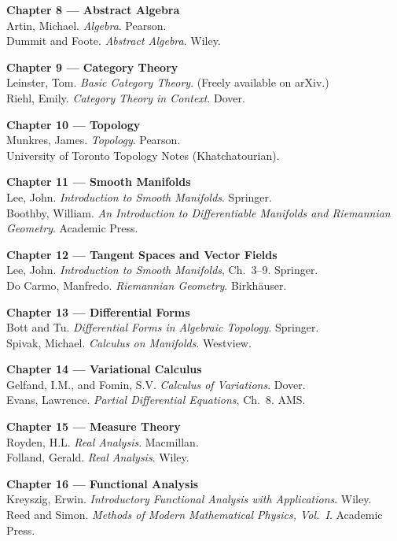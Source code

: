 \documentclass[12pt, twoside, openright, a4paper]{book}
\begin{document}
\medskip\noindent\textbf{Chapter 8 --- Abstract Algebra}\\
Artin, Michael. \textit{Algebra}. Pearson.\\
Dummit and Foote. \textit{Abstract Algebra}. Wiley.

\medskip\noindent\textbf{Chapter 9 --- Category Theory}\\
Leinster, Tom. \textit{Basic Category Theory}. (Freely available on arXiv.)\\
Riehl, Emily. \textit{Category Theory in Context}. Dover.

\medskip\noindent\textbf{Chapter 10 --- Topology}\\
Munkres, James. \textit{Topology}. Pearson.\\
University of Toronto Topology Notes (Khatchatourian).

\medskip\noindent\textbf{Chapter 11 --- Smooth Manifolds}\\
Lee, John. \textit{Introduction to Smooth Manifolds}. Springer.\\
Boothby, William. \textit{An Introduction to Differentiable Manifolds and Riemannian Geometry}. Academic Press.

\medskip\noindent\textbf{Chapter 12 --- Tangent Spaces and Vector Fields}\\
Lee, John. \textit{Introduction to Smooth Manifolds}, Ch.\ 3--9. Springer.\\
Do Carmo, Manfredo. \textit{Riemannian Geometry}. Birkh\"auser.

\medskip\noindent\textbf{Chapter 13 --- Differential Forms}\\
Bott and Tu. \textit{Differential Forms in Algebraic Topology}. Springer.\\
Spivak, Michael. \textit{Calculus on Manifolds}. Westview.

\medskip\noindent\textbf{Chapter 14 --- Variational Calculus}\\
Gelfand, I.M., and Fomin, S.V. \textit{Calculus of Variations}. Dover.\\
Evans, Lawrence. \textit{Partial Differential Equations}, Ch.\ 8. AMS.

\medskip\noindent\textbf{Chapter 15 --- Measure Theory}\\
Royden, H.L. \textit{Real Analysis}. Macmillan.\\
Folland, Gerald. \textit{Real Analysis}. Wiley.

\medskip\noindent\textbf{Chapter 16 --- Functional Analysis}\\
Kreyszig, Erwin. \textit{Introductory Functional Analysis with Applications}. Wiley.\\
Reed and Simon. \textit{Methods of Modern Mathematical Physics, Vol.\ I}. Academic Press.
\end{document}
